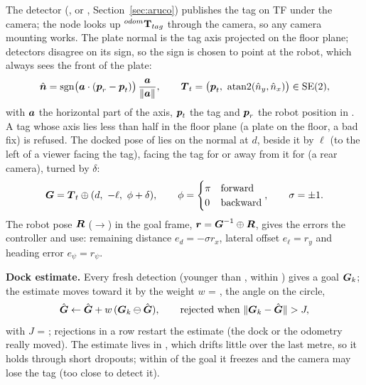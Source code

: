 The detector (, or , Section~\ref{sec:aruco})
publishes the tag on TF under the camera; the node looks up ${}^{odom}\mathbf{T}_{tag}$ through the camera,
so any camera mounting works. The plate normal is the tag axis  projected
on the floor plane; detectors disagree on its sign, so the sign is chosen to point at the robot,
which always sees the front of the plate:
\begin{equation}
  \hat{\boldsymbol{n}} = \operatorname{sgn}\!\big(\boldsymbol{a}\cdot(\boldsymbol{p}_r - \boldsymbol{p}_t)\big)\,
  \frac{\boldsymbol{a}}{\lVert\boldsymbol{a}\rVert}, \qquad
  \boldsymbol{T}_t = \big(\boldsymbol{p}_t,\ \operatorname{atan2}(\hat n_y, \hat n_x)\big) \in \mathrm{SE}(2),
\end{equation}
with $\boldsymbol{a}$ the horizontal part of the axis, $\boldsymbol{p}_t$ the tag and $\boldsymbol{p}_r$ the robot
position in . A tag whose axis lies less than half in the floor plane (a plate on the
floor, a bad fix) is refused. The docked pose of  lies on the normal at
 $d$, beside it by  $\ell$ (to the left of a
viewer facing the tag), facing the tag for   or away from it
for  (a rear camera), turned by  $\delta$:
\begin{equation}
  \vect{G} = \vect{T}_t \oplus (d,\ -\ell,\ \phi + \delta), \qquad
  \phi = \begin{cases} \pi & \text{forward} \\ 0 & \text{backward} \end{cases}, \qquad
  \sigma = \pm 1.
\end{equation}
The robot pose $\boldsymbol{R}$ ($\to$) in the goal frame,
$\boldsymbol{r} = \boldsymbol{G}^{-1} \oplus \boldsymbol{R}$, gives the errors the controller and
 use: remaining distance $e_d = -\sigma r_x$, lateral offset
$e_\ell = r_y$ and heading error $e_\psi = r_\psi$.

\textbf{Dock estimate.} Every fresh detection (younger than , within
) gives a goal $\boldsymbol{G}_k$; the estimate moves toward it by the weight
$w$ = , the angle on the circle,
\begin{equation}
  \hat{\boldsymbol{G}} \leftarrow \hat{\boldsymbol{G}} + w\,(\boldsymbol{G}_k \ominus \hat{\boldsymbol{G}}), \qquad
  \text{rejected when } \lVert \boldsymbol{G}_k - \hat{\boldsymbol{G}} \rVert > J,
\end{equation}
with $J$ = ;  rejections in a row restart the
estimate (the dock or the odometry really moved). The estimate lives in , which drifts
little over the last metre, so it holds through short dropouts; within
 of the goal it freezes and the camera may lose the tag (too
close to detect it).


